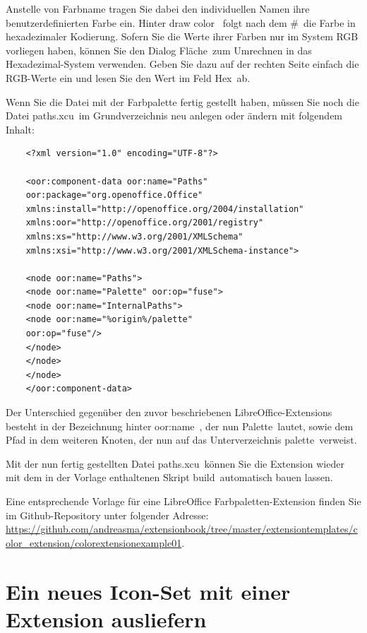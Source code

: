 \documentclass[12pt,a4paper,titlepage]{book}
\begin{document}
Anstelle von Farbname tragen Sie dabei den individuellen Namen ihre benutzerdefinierten Farbe ein. Hinter \glqq draw color\grqq~ folgt nach dem \glqq \#\grqq~die Farbe in hexadezimaler Kodierung. Sofern Sie die Werte ihrer Farben nur im System RGB vorliegen haben, können Sie den Dialog \glqq Fläche\grqq~zum Umrechnen in das Hexadezimal-System verwenden. Geben Sie dazu auf der rechten Seite einfach die RGB-Werte ein und lesen Sie den Wert im Feld \glqq Hex\grqq~ab.

Wenn Sie die Datei mit der Farbpalette fertig gestellt haben, müssen Sie noch die Datei \glqq paths.xcu\grqq~im Grundverzeichnis neu anlegen oder ändern mit folgendem Inhalt:


\begin{lstlisting}
	<?xml version="1.0" encoding="UTF-8"?>
	
	<oor:component-data oor:name="Paths" 
	oor:package="org.openoffice.Office" 
	xmlns:install="http://openoffice.org/2004/installation" 
	xmlns:oor="http://openoffice.org/2001/registry"
	xmlns:xs="http://www.w3.org/2001/XMLSchema" 
	xmlns:xsi="http://www.w3.org/2001/XMLSchema-instance">
	
	<node oor:name="Paths">
	<node oor:name="Palette" oor:op="fuse">
	<node oor:name="InternalPaths">
	<node oor:name="%origin%/palette" 
	oor:op="fuse"/>
	</node>
	</node>
	</node>
	</oor:component-data>
\end{lstlisting}

Der Unterschied gegenüber den zuvor beschriebenen LibreOffice-Extensions besteht in der Bezeichnung hinter \glqq oor:name\grqq~, der nun \glqq Palette\grqq~lautet, sowie dem Pfad in dem weiteren Knoten, der nun auf das Unterverzeichnis \glqq palette\grqq~verweist.

Mit der nun fertig gestellten Datei \glqq paths.xcu\grqq~können Sie die Extension wieder mit dem in der Vorlage enthaltenen Skript \glqq build\grqq~automatisch bauen lassen.

Eine entsprechende Vorlage für eine LibreOffice Farbpaletten-Extension finden Sie im Github-Repository unter folgender Adresse:\linebreak
\url{https://github.com/andreasma/extensionbook/tree/master/extensiontemplates/color_extension/colorextensionexample01}.

\chapter{Ein neues Icon-Set mit einer Extension ausliefern}
\end{document}
